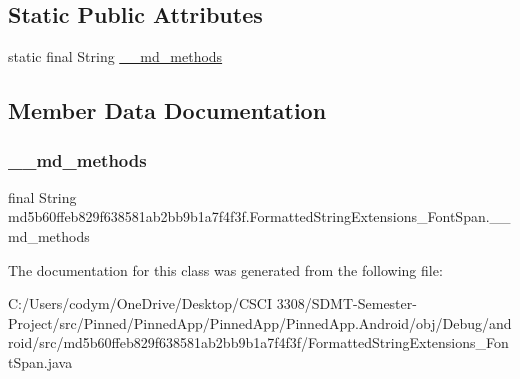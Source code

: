 \subsection*{Static Public Attributes}
\begin{DoxyCompactItemize}
\item 
static final String \hyperlink{classmd5b60ffeb829f638581ab2bb9b1a7f4f3f_1_1_formatted_string_extensions___font_span_a9dd575283d39b7b83571ef7dbbde9f63}{\+\_\+\+\_\+md\+\_\+methods}
\end{DoxyCompactItemize}


\subsection{Member Data Documentation}
\mbox{\label{classmd5b60ffeb829f638581ab2bb9b1a7f4f3f_1_1_formatted_string_extensions___font_span_a9dd575283d39b7b83571ef7dbbde9f63}} 
\subsubsection{\texorpdfstring{\+\_\+\+\_\+md\+\_\+methods}{\_\_md\_methods}}
{\footnotesize\ttfamily final String md5b60ffeb829f638581ab2bb9b1a7f4f3f.\+Formatted\+String\+Extensions\+\_\+\+Font\+Span.\+\_\+\+\_\+md\+\_\+methods\hspace{0.3cm}{\ttfamily [static]}}



The documentation for this class was generated from the following file\+:\begin{DoxyCompactItemize}
\item 
C\+:/\+Users/codym/\+One\+Drive/\+Desktop/\+C\+S\+C\+I 3308/\+S\+D\+M\+T-\/\+Semester-\/\+Project/src/\+Pinned/\+Pinned\+App/\+Pinned\+App/\+Pinned\+App.\+Android/obj/\+Debug/android/src/md5b60ffeb829f638581ab2bb9b1a7f4f3f/Formatted\+String\+Extensions\+\_\+\+Font\+Span.\+java\end{DoxyCompactItemize}
